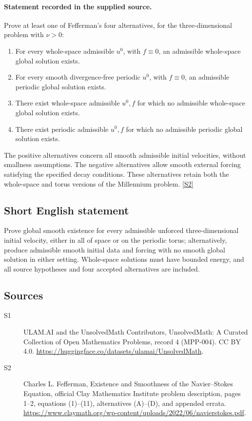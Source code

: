 \documentclass[11pt]{article}
\newcommand{\sref}[2]{\hyperlink{source:#1:#2}{[S#2]}}
\begin{document}
\paragraph{Statement recorded in the supplied source.}
Prove at least one of Fefferman's four alternatives, for the three-dimensional problem with $\nu>0$:
\begin{enumerate}
\item[(A)] For every whole-space admissible $u^0$, with $f\equiv0$, an admissible whole-space global solution exists.
\item[(B)] For every smooth divergence-free periodic $u^0$, with $f\equiv0$, an admissible periodic global solution exists.
\item[(C)] There exist whole-space admissible $u^0,f$ for which no admissible whole-space global solution exists.
\item[(D)] There exist periodic admissible $u^0,f$ for which no admissible periodic global solution exists.
\end{enumerate}
The positive alternatives concern all smooth admissible initial velocities, without smallness assumptions. The negative alternatives allow smooth external forcing satisfying the specified decay conditions. These alternatives retain both the whole-space and torus versions of the Millennium problem. \sref{4}{2}
\subsection{Short English statement}
Prove global smooth existence for every admissible unforced three-dimensional initial velocity, either in all of space or on the periodic torus; alternatively, produce admissible smooth initial data and forcing with no smooth global solution in either setting. Whole-space solutions must have bounded energy, and all source hypotheses and four accepted alternatives are included.
\subsection{Sources}
\begin{description}
\item[\hypertarget{source:4:1}{S1}] ULAM.AI and the UnsolvedMath Contributors, UnsolvedMath: A Curated Collection of Open Mathematics Problems, record 4 (MPP-004). CC BY 4.0. \url{https://huggingface.co/datasets/ulamai/UnsolvedMath}.
\item[\hypertarget{source:4:2}{S2}] Charles L. Fefferman, Existence and Smoothness of the Navier–Stokes Equation, official Clay Mathematics Institute problem description, pages 1--2, equations (1)--(11), alternatives (A)--(D), and appended errata. \url{https://www.claymath.org/wp-content/uploads/2022/06/navierstokes.pdf}.
\end{description}
\label{end:4}
\end{document}
